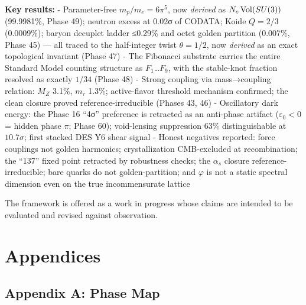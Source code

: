 \documentclass[
  11pt,
]{article}
\begin{document}
\textbf{Key results:} - Parameter-free \(m_p/m_e = 6\pi^5\), now
\emph{derived} as \(N_c\,{\rm Vol}(SU(3))\) (99.9981\%, Phase 49);
neutron excess at 0.02σ of CODATA; Koide \(Q = 2/3\) (0.0009\%); baryon
decuplet ladder ≤0.29\% and octet golden partition (0.007\%, Phase 45)
--- all traced to the half-integer twist \(\theta = 1/2\), now
\emph{derived} as an exact topological invariant (Phase 47) - The
Fibonacci substrate carries the entire Standard Model counting structure
as \(F_1\)\ldots{}\(F_9\), with the stable-knot fraction resolved as
exactly \(1/34\) (Phase 48) - Strong coupling via mass→coupling
relation: \(M_Z\) 3.1\%, \(m_\tau\) 1.3\%; active-flavor threshold
mechanism confirmed; the clean closure proved reference-irreducible
(Phases 43, 46) - Oscillatory dark energy: the Phase 16 ``4σ''
preference is retracted as an anti-phase artifact (\(\varepsilon_0<0\) =
hidden phase \(\pi\); Phase 60); void-lensing suppression 63\%
distinguishable at \(10.7\sigma\); first stacked DES Y6 shear signal -
Honest negatives reported: force couplings not golden harmonics;
crystallization CMB-excluded at recombination; the ``137'' fixed point
retracted by robustness checks; the \(\alpha_s\) closure
reference-irreducible; bare quarks do not golden-partition; and
\(\varphi\) is not a static spectral dimension even on the true
incommensurate lattice

The framework is offered as a work in progress whose claims are intended
to be evaluated and revised against observation.

\section{Appendices}\label{appendices}

\subsection{Appendix A: Phase Map}\label{appendix-a-phase-map}
\end{document}
